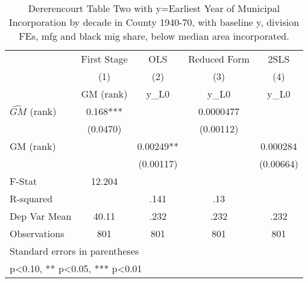\begin{table}[htbp]\centering
\def\sym#1{\ifmmode^{#1}\else\(^{#1}\)\fi}
\caption{Dererencourt Table Two with y=Earliest Year of Municipal Incorporation by decade in County 1940-70, with baseline y, division FEs, mfg and black mig share, below median area incorporated.}
\begin{tabular}{l*{4}{c}}
\toprule
                    & First Stage   &         OLS   &Reduced Form   &        2SLS   \\
                    &\multicolumn{1}{c}{(1)}&\multicolumn{1}{c}{(2)}&\multicolumn{1}{c}{(3)}&\multicolumn{1}{c}{(4)}\\
                    &\multicolumn{1}{c}{GM  (rank)}&\multicolumn{1}{c}{y\_L0}&\multicolumn{1}{c}{y\_L0}&\multicolumn{1}{c}{y\_L0}\\
\midrule
$\hat{GM}$ (rank)   &       0.168***&               &   0.0000477   &               \\
                    &    (0.0470)   &               &   (0.00112)   &               \\
\addlinespace
GM  (rank)          &               &     0.00249** &               &    0.000284   \\
                    &               &   (0.00117)   &               &   (0.00664)   \\
\midrule
F-Stat              &      12.204   &               &               &               \\
R-squared           &               &        .141   &         .13   &               \\
Dep Var Mean        &       40.11   &        .232   &        .232   &        .232   \\
Observations        &         801   &         801   &         801   &         801   \\
\bottomrule
\multicolumn{5}{l}{\footnotesize Standard errors in parentheses}\\
\multicolumn{5}{l}{\footnotesize * p<0.10, ** p<0.05, *** p<0.01}\\
\end{tabular}
\end{table}
